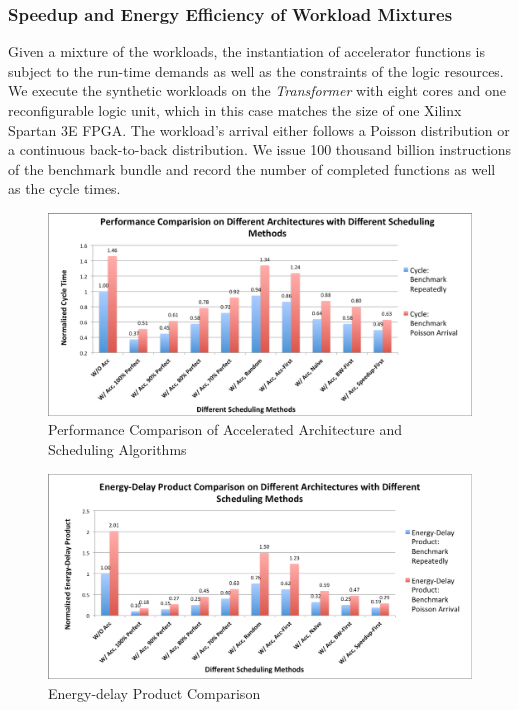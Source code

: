 \subsubsection{Speedup and Energy Efficiency of Workload Mixtures}

Given a mixture of the workloads, the instantiation of accelerator
functions is subject to the run-time demands as well as the constraints of the logic resources.
 We execute the synthetic workloads on the {\em Transformer} with eight
cores and one reconfigurable logic unit, which in this case matches the size of one Xilinx
Spartan 3E FPGA. The workload's arrival either follows a Poisson distribution or
a continuous back-to-back distribution. We issue 100 thousand billion instructions of
the benchmark bundle and record the number of completed functions as well as the
cycle times. 

\begin{figure}
    \centering
    \includegraphics[width=4.5in]{Cycle-8core}
    \caption{Performance Comparison of Accelerated Architecture and Scheduling Algorithms}
    \label{fig_8core_cycle}
\end{figure}

\begin{figure}
    \centering
    \includegraphics[width=4.5in]{Energy-Delay-8core}
    \caption{Energy-delay Product Comparison}
    \label{fig_8core_energy_delay}
\end{figure}

